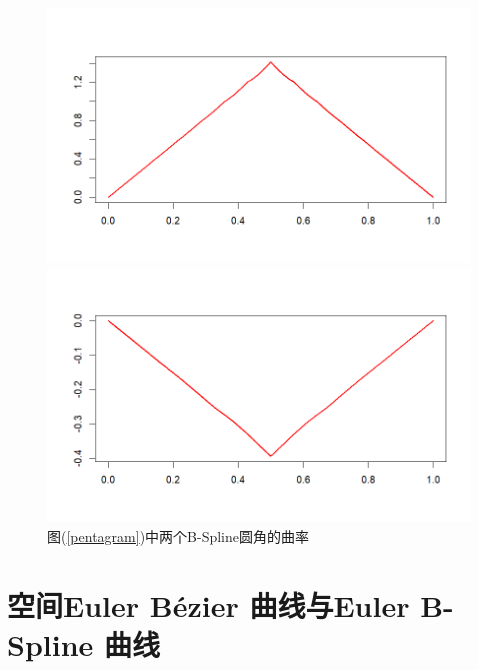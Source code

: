 \documentclass[utf8]{ctexart} %
\numberwithin{figure}{section}
\numberwithin{equation}{section}
\begin{document}
\begin{figure}
	\centering
	\begin{minipage}{0.49\linewidth}
		\centering
		\includegraphics[width=0.7\linewidth]{figures/Pentagram_B-Spline1.png}
	\end{minipage}
	\begin{minipage}{0.49\linewidth}
		\centering
		\includegraphics[width=0.7\linewidth]{figures/Pentagram_B-Spline2.png}
	\end{minipage}
\caption{\small{图(\ref{pentagram})中两个B-Spline圆角的曲率}}
\end{figure}
	 \section{空间Euler B\'{e}zier 曲线与Euler B-Spline 曲线}
\end{document}
